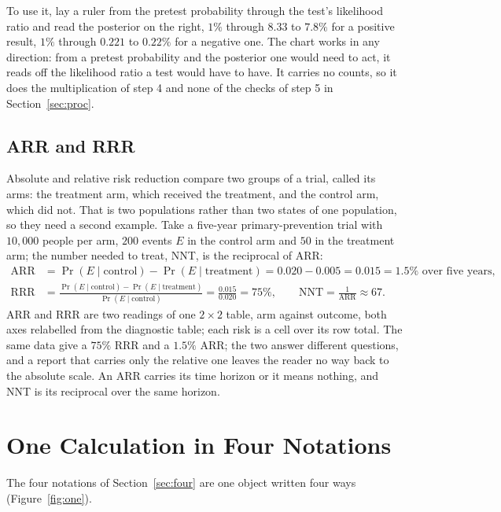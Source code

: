 \documentclass[11pt]{article}
\begin{document}
To use it, lay a ruler from the pretest probability through the test's likelihood ratio and read the posterior on the right, $1\%$ through $8.33$ to $7.8\%$ for a positive result, $1\%$ through $0.221$ to $0.22\%$ for a negative one. The chart works in any direction: from a pretest probability and the posterior one would need to act, it reads off the likelihood ratio a test would have to have. It carries no counts, so it does the multiplication of step 4 and none of the checks of step 5 in Section~\ref{sec:proc}.

\subsection{ARR and RRR}
\label{sec:arr}

Absolute and relative risk reduction compare two groups of a trial, called its arms: the treatment arm, which received the treatment, and the control arm, which did not. That is two populations rather than two states of one population, so they need a second example. Take a five-year primary-prevention trial with $10{,}000$ people per arm, $200$ events $E$ in the control arm and $50$ in the treatment arm; the number needed to treat, NNT, is the reciprocal of ARR:
\begin{align*}
  \mathrm{ARR} &= \Pr(E \mid \text{control}) - \Pr(E \mid \text{treatment}) = 0.020 - 0.005 = 0.015 = 1.5\% \text{ over five years}, \\
  \mathrm{RRR} &= \frac{\Pr(E \mid \text{control}) - \Pr(E \mid \text{treatment})}{\Pr(E \mid \text{control})} = \frac{0.015}{0.020} = 75\%, \qquad
  \mathrm{NNT} = \frac{1}{\mathrm{ARR}} \approx 67.
\end{align*}
ARR and RRR are two readings of one $2\times 2$ table, arm against outcome, both axes relabelled from the diagnostic table; each risk is a cell over its row total. The same data give a $75\%$ RRR and a $1.5\%$ ARR; the two answer different questions, and a report that carries only the relative one leaves the reader no way back to the absolute scale. An ARR carries its time horizon or it means nothing, and NNT is its reciprocal over the same horizon.

\section{One Calculation in Four Notations}
\label{sec:iso}

The four notations of Section~\ref{sec:four} are one object written four ways (Figure~\ref{fig:one}).
\end{document}
